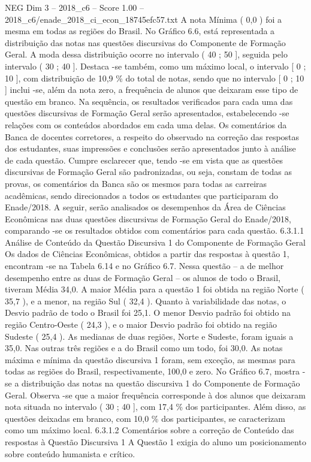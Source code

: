 \begin{textsample}{NEG Dim 3 – 2018\_c6 – Score 1.00 – 2018\_c6/enade\_2018\_ci\_econ\_18745efc57.txt}
A nota Mínima ( 0,0 ) foi a mesma em todas as regiões do Brasil.
No Gráfico 6.6, está representada a distribuição das notas nas questões discursivas do Componente de Formação Geral.
A moda dessa distribuição ocorre no intervalo ( 40 ; 50 ], seguida pelo intervalo ( 30 ; 40 ].
Destaca -se também, como um máximo local, o intervalo [ 0 ; 10 ], com distribuição de 10,9 \% do total de notas, sendo que no intervalo [ 0 ; 10 ] inclui -se, além da nota zero, a frequência de alunos que deixaram esse tipo de questão em branco.
Na sequência, os resultados verificados para cada uma das questões discursivas de Formação Geral serão apresentados, estabelecendo -se relações com os conteúdos abordados em cada uma delas.
Os comentários da Banca de docentes corretores, a respeito do observado na correção das respostas dos estudantes, suas impressões e conclusões serão apresentados junto à análise de cada questão.
Cumpre esclarecer que, tendo -se em vista que as questões discursivas de Formação Geral são padronizadas, ou seja, constam de todas as provas, os comentários da Banca são os mesmos para todas as carreiras acadêmicas, sendo direcionados a todos os estudantes que participaram do Enade/2018.
A seguir, serão analisados os desempenhos da Área de Ciências Econômicas nas duas questões discursivas de Formação Geral do Enade/2018, comparando -se os resultados obtidos com comentários para cada questão. 6.3.1.1 Análise de Conteúdo da Questão Discursiva 1 do Componente de Formação Geral Os dados de Ciências Econômicas, obtidos a partir das respostas à questão 1, encontram -se na Tabela 6.14 e no Gráfico 6.7.
Nessa questão – a de melhor desempenho entre as duas de Formação Geral – os alunos de todo o Brasil, tiveram Média 34,0.
A maior Média para a questão 1 foi obtida na região Norte ( 35,7 ), e a menor, na região Sul ( 32,4 ).
Quanto à variabilidade das notas, o Desvio padrão de todo o Brasil foi 25,1.
O menor Desvio padrão foi obtido na região Centro-Oeste ( 24,3 ), e o maior Desvio padrão foi obtido na região Sudeste ( 25,4 ).
As medianas de duas regiões, Norte e Sudeste, foram iguais a 35,0.
Nas outras três regiões e a do Brasil como um todo, foi 30,0.
As notas máxima e mínima da questão discursiva 1 foram, sem exceção, as mesmas para todas as regiões do Brasil, respectivamente, 100,0 e zero.
No Gráfico 6.7, mostra -se a distribuição das notas na questão discursiva 1 do Componente de Formação Geral.
Observa -se que a maior frequência corresponde à dos alunos que deixaram nota situada no intervalo ( 30 ; 40 ], com 17,4 \% dos participantes.
Além disso, as questões deixadas em branco, com 10,0 \% dos participantes, se caracterizam como um máximo local. 6.3.1.2 Comentários sobre a correção de Conteúdo das respostas à Questão Discursiva 1 A Questão 1 exigia do aluno um posicionamento sobre conteúdo humanista e crítico.

\end{textsample}

